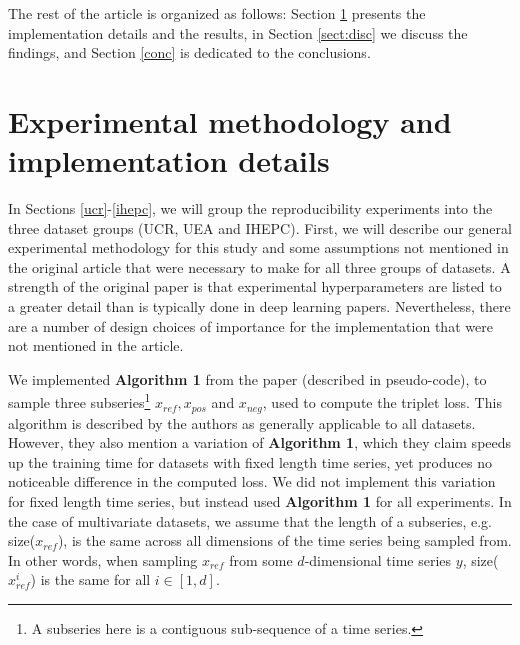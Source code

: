 \documentclass{article}
\begin{document}
The rest of the article is organized as follows: Section \ref{expmet} presents the implementation details and the results, in Section \ref{sect:disc} we discuss the findings, and Section \ref{conc} is dedicated to the conclusions.

% 


\section{Experimental methodology and implementation details}
\label{expmet}
In Sections \ref{ucr}-\ref{ihepc}, we will group the reproducibility experiments into the three dataset groups (UCR, UEA and IHEPC). First, we will describe our general experimental methodology for this study and some assumptions not mentioned in the original article that were necessary to make for all three groups of datasets. A strength of the original paper is that experimental hyperparameters are listed to a greater detail than is typically done in deep learning papers. Nevertheless, there are a number of design choices of importance for the implementation that were not mentioned in the article. 

We implemented \textbf{Algorithm 1} from the paper (described in pseudo-code), to sample three subseries\footnote{A subseries here is a contiguous sub-sequence of a time series.} $x_{ref}, x_{pos}$ and $x_{neg}$, used to compute the triplet loss. This algorithm is described by the authors as generally applicable to all datasets. However, they also mention a variation of \textbf{Algorithm 1}, which they claim speeds up the training time for datasets with fixed length time series, yet produces no noticeable difference in the computed loss. We did not implement this variation for fixed length time series, but instead used \textbf{Algorithm 1} for all experiments. In the case of multivariate datasets, we assume that the length of a subseries, e.g. size($x_{ref}$), is the same across all dimensions of the time series being sampled from. In other words, when sampling $x_{ref}$ from some $d$-dimensional time series $y$, size($x^{i}_{ref}$) is the same for all $i\in[1,d]$.
\end{document}
